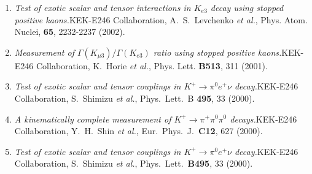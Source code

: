 \documentclass[10pt,a4paper]{article}
\def\pub#1#2#3{{\it #1.}\newline #2, #3.}
\def\mybpub#1#2#3{{\boldmath \bf #1.}\newline #2, #3.}
\def\PLB#1{Phys. Lett. {\bf B#1}}
\def\etal{{\it et al.}}
\begin{document}
\begin{enumerate}



\item
\pub{Test of exotic scalar and tensor interactions in $K_{e3}$ decay using stopped positive kaons}
{KEK-E246 Collaboration, A.~S.~Levchenko \etal}
{Phys. Atom. Nuclei, {\bf 65}, 2232-2237 (2002)}

\item
\pub{Measurement of $\Gamma(K_{\mu 3})/\Gamma(K_{e3})$ ratio using stopped positive kaons}
{KEK-E246 Collaboration, K.~Horie \etal}
{\PLB{513}, 311 (2001)}

\item
\pub{Test of exotic scalar and tensor couplings in $K^+ \to \pi^0 e^+
\nu$ decay}
{KEK-E246 Collaboration, S.~Shimizu \etal}
{Phys.\ Lett.\ B {\bf 495}, 33 (2000)}

\item 
\pub{A kinematically complete measurement of $K^+ \to \pi^+
\pi^0 \pi^0$ decays}
{KEK-E246 Collaboration, Y.~H.~Shin \etal}
{Eur.\ Phys.\ J.\ {\bf C12}, 627 (2000)}

\item 
\pub{Test of exotic scalar and tensor couplings in $K^+ \to
\pi^0 e^+ \nu$ decay}
{KEK-E246 Collaboration, S.~Shimizu \etal}
{Phys.\ Lett.\ {\bf B495}, 33 (2000)}









\end{enumerate}
\end{document}
